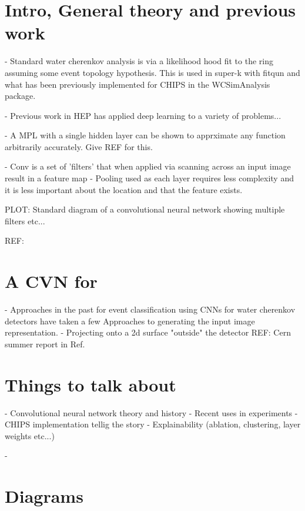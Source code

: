 \section{Intro, General theory and previous work}
- Standard water cherenkov analysis is via a likelihood hood fit to the ring assuming some event topology hypothesis.
This is used in super-k with fitqun and what has been previously implemented for CHIPS in the WCSimAnalysis package.

- Previous work in HEP has applied deep learning to a variety of problems...



- A MPL with a single hidden layer can be shown to apprximate any function arbitrarily accurately. Give REF for this.

- Conv is a set of 'filters' that when applied via scanning across an input image result in a feature map
- Pooling used as each layer requires less complexity and it is less important about the location and that the feature exists.


PLOT: Standard diagram of a convolutional neural network showing multiple filters etc...

REF:

\section{A CVN for \chips}

- Approaches in the past for event classification using CNNs for water cherenkov detectors have taken a few Approaches
to generating the input image representation.
- Projecting onto a 2d surface "outside" the detector
REF: Cern summer report in Ref.~\cite{theodore2016}




\section{Things to talk about}
- Convolutional neural network theory and history
- Recent uses in experiments
- CHIPS implementation tellig the story
- Explainability (ablation, clustering, layer weights etc...)

-


\section{Diagrams}

